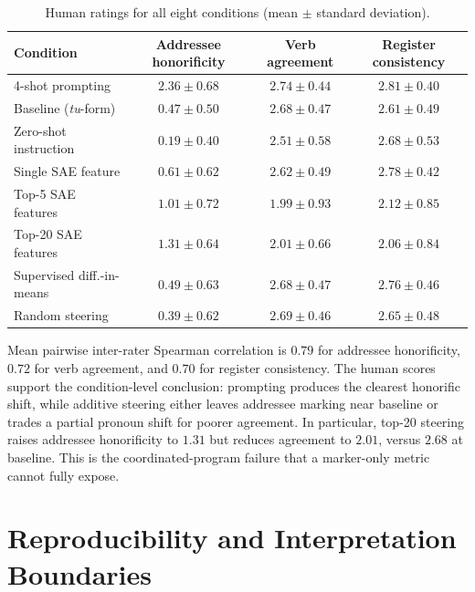 \documentclass[10pt]{article}
\newcommand{\tu}{\textit{tu}}
\begin{document}
\begin{table}[H]
\centering
\small
\setlength\tabcolsep{8pt}
\begin{tabular}{lccc}
\toprule
\textbf{Condition} & \textbf{Addressee honorificity} & \textbf{Verb agreement} & \textbf{Register consistency} \\
\midrule
4-shot prompting & $2.36\pm0.68$ & $2.74\pm0.44$ & $2.81\pm0.40$ \\
Baseline (\tu-form) & $0.47\pm0.50$ & $2.68\pm0.47$ & $2.61\pm0.49$ \\
Zero-shot instruction & $0.19\pm0.40$ & $2.51\pm0.58$ & $2.68\pm0.53$ \\
Single SAE feature & $0.61\pm0.62$ & $2.62\pm0.49$ & $2.78\pm0.42$ \\
Top-5 SAE features & $1.01\pm0.72$ & $1.99\pm0.93$ & $2.12\pm0.85$ \\
Top-20 SAE features & $1.31\pm0.64$ & $2.01\pm0.66$ & $2.06\pm0.84$ \\
Supervised diff.-in-means & $0.49\pm0.63$ & $2.68\pm0.47$ & $2.76\pm0.46$ \\
Random steering & $0.39\pm0.62$ & $2.69\pm0.46$ & $2.65\pm0.48$ \\
\bottomrule
\end{tabular}
\caption{Human ratings for all eight conditions (mean $\pm$ standard deviation).}
\label{tab:human}
\end{table}

Mean pairwise inter-rater Spearman correlation is $0.79$ for addressee
honorificity, $0.72$ for verb agreement, and $0.70$ for register consistency.
The human scores
support the condition-level conclusion: prompting produces the clearest
honorific shift, while additive steering either leaves addressee marking near
baseline or trades a partial pronoun shift for poorer agreement. In particular,
top-20 steering raises addressee honorificity to $1.31$ but reduces agreement
to $2.01$, versus $2.68$ at baseline. This is the coordinated-program failure
that a marker-only metric cannot fully expose.
\FloatBarrier

\section{Reproducibility and Interpretation Boundaries}
\end{document}
